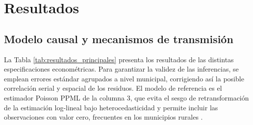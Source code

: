 \documentclass[
  spanish,
  12pt,
  letterpaper]{article}
\begin{document}
\section{Resultados}\label{sec-resultados}

\subsection{Modelo causal y mecanismos de
transmisión}\label{modelo-causal-y-mecanismos-de-transmisiuxf3n}

La Tabla \ref{tab:resultados_principales} presenta los resultados de las
distintas especificaciones econométricas. Para garantizar la validez de
las inferencias, se emplean errores estándar agrupados a nivel
municipal, corrigiendo así la posible correlación serial y espacial de
los residuos. El modelo de referencia es el estimador Poisson PPML de la
columna 3, que evita el sesgo de retransformación de la estimación
log-lineal bajo heterocedasticidad y permite incluir las observaciones
con valor cero, frecuentes en los municipios rurales
\parencite{silva2006log}.
\end{document}
